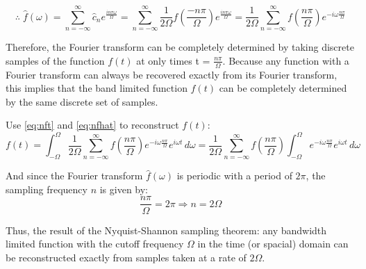 \documentclass[12pt]{article}
\newcommand{\inftyint}{\int_{-\infty}^{\infty}}
\begin{document}
\begin{equation} \label{eq:nfhat} \therefore \; \hat{f}(\omega) = \sum_{n =
    -\infty}^{\infty} \hat{c}_{n}e^{\frac{i n \pi \omega}{\Omega}} = \sum_{n =
    -\infty}^{\infty} \frac{1}{2\Omega} f(\frac{-n\pi}{\Omega})e^{\frac{i n \pi
    \omega}{\Omega}} = \frac{1}{2\Omega} \sum_{n = -\infty}^{\infty}
    f(\frac{n\pi}{\Omega})e^{-i \omega \frac{n \pi}{\Omega} } 
\end{equation}

Therefore, the Fourier transform can be completely determined by taking
discrete samples of the function \( f(t) \) at only times t = \(
\frac{n\pi}{\Omega}\). Because any function with a Fourier transform can 
always be recovered exactly from its Fourier transform, this implies that the 
band limited function \( f(t)\) can be completely determined by the same 
discrete set of samples.

Use \eqref{eq:nft} and \eqref{eq:nfhat} to reconstruct \( f(t)  \):
\begin{equation} \label{eq:ndtft} f(t) = \int_{-\Omega}^{\Omega}
    \frac{1}{2\Omega} \sum_{n = -\infty}^{\infty} f(\frac{n\pi}{\Omega})e^{-i
    \omega \frac{n \pi}{\Omega} } e^{i\omega t} \,d\omega = \frac{1}{2\Omega}
    \sum_{n = -\infty}^{\infty} f(\frac{n\pi}{\Omega}) \int_{-\Omega}^{\Omega}
    e^{-i \omega \frac{n \pi}{\Omega} } e^{i\omega t} \, d\omega \end{equation}

And since the Fourier transform \( \hat{f}(\omega) \) is periodic with a period
of \( 2\pi\), the sampling frequency \( n\) is given by: \[ \frac{n\pi}{\Omega}
= 2\pi \Rightarrow n = 2\Omega\]

Thus, the result of the Nyquist-Shannon sampling theorem: any bandwidth limited
function with the cutoff frequency \( \Omega \) in the time (or spacial) domain
can be reconstructed exactly from samples taken at a rate of \( 2\Omega \).

%
%
\end{document}
